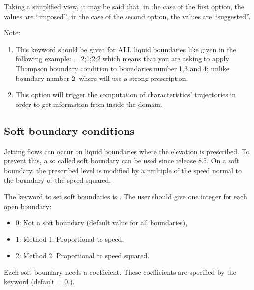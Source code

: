 Taking a simplified view, it may be said that, in the case of the first option,
the values are ``imposed'', in the case of the second option, the values are
``suggested''.

\begin{WarningBlock}{Note:}
\begin{enumerate}
\item This keyword should be given for ALL liquid boundaries like given in the
following example: \newline
{}= 2;1;2;2 \newline
which means that you are asking  to apply Thompson boundary
condition to boundaries number 1,3 and 4;
unlike boundary number 2, where  will use a strong prescription.
\item This option will trigger the computation of characteristics' trajectories
in order to get information from inside the domain.
\end{enumerate}
\end{WarningBlock}

\subsection{Soft boundary conditions}

Jetting flows can occur on liquid boundaries where the elevation is prescribed.
To prevent this, a so called soft boundary can be used since release 8.5.
On a soft boundary, the prescribed level is modified by a multiple of the speed
normal to the boundary or the speed squared. \newline

The keyword to set soft boundaries is . The user
should give one integer for each open boundary:

\begin{itemize}
\item 0: Not a soft boundary (default value for all boundaries),

\item 1: Method 1. Proportional to speed,

\item 2: Method 2. Proportional to speed squared.
\end{itemize}

Each soft boundary needs a coefficient.
These coefficients are specified by the keyword
 (default = 0.). \newline

